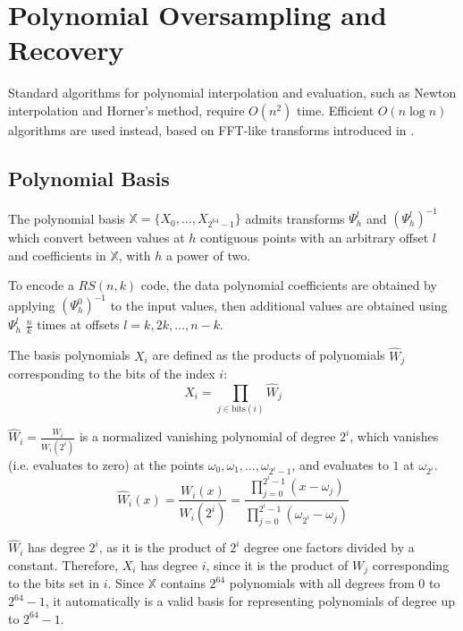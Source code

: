 \chapter{Polynomial Oversampling and Recovery}

Standard algorithms for polynomial interpolation and evaluation, such as Newton interpolation and Horner's method, require $O(n^2)$ time.
Efficient $O(n \log n)$ algorithms are used instead, based on FFT-like transforms introduced in \cite{novel-poly}.

\section{Polynomial Basis}

The polynomial basis $\mathbb{X} = \{X_0, \ldots, X_{2^{64} - 1}\}$ admits transforms $\Psi_h^l$ and $(\Psi_h^l)^{-1}$ which convert between values at $h$ contiguous points with an arbitrary offset $l$ and coefficients in $\mathbb{X}$, with $h$ a power of two.

To encode a $RS(n, k)$ code, the data polynomial coefficients are obtained by applying $(\Psi_h^0)^{-1}$ to the input values, then additional values are obtained using $\Psi_h^l$ $\frac{n}{k}$ times at offsets $l = k, 2k, \ldots, n - k$.

The basis polynomials $X_i$ are defined as the products of polynomials $\hat{W}_j$ corresponding to the bits of the index $i$:
\begin{equation}X_i = \prod_{j \in \text{bits}(i)} \hat{W}_j\end{equation}

$\hat{W}_i = \frac{W_i}{W_i(2^{i})}$ is a normalized vanishing polynomial of degree $2^{i}$, which vanishes (i.e. evaluates to zero) at the points $\omega_0, \omega_1, \ldots, \omega_{2^{i} - 1}$, and evaluates to $1$ at $\omega_{2^{i}}$.
\begin{equation}\hat{W}_i(x) = \frac{W_i(x)}{W_i(2^{i})} = \frac{\prod_{j = 0}^{2^i - 1} (x - \omega_j)}{\prod_{j = 0}^{2^i - 1} (\omega_{2^i} - \omega_j)}\end{equation}

$\hat{W}_i$ has degree $2^{i}$, as it is the product of $2^{i}$ degree one factors divided by a constant. Therefore, $X_i$ has degree $i$, since it is the product of $W_j$ corresponding to the bits set in $i$.
Since $\mathbb{X}$ contains $2^{64}$ polynomials with all degrees from $0$ to $2^{64} - 1$, it automatically is a valid basis for representing polynomials of degree up to $2^{64} - 1$.

